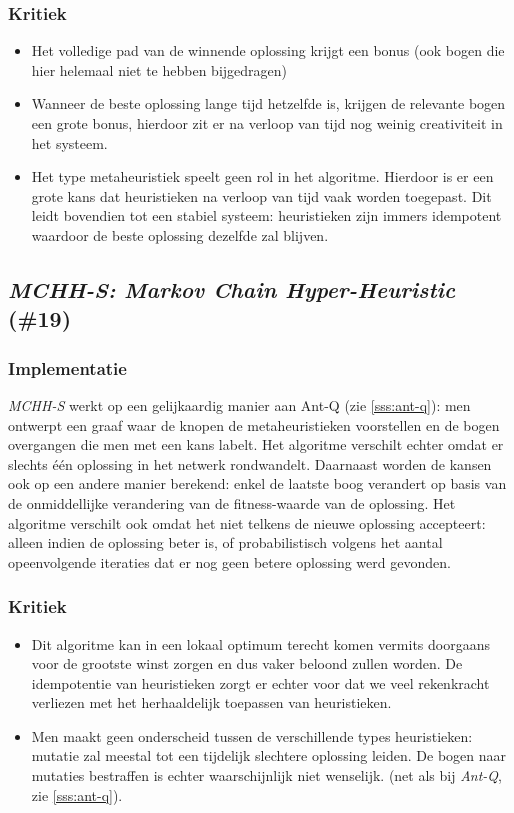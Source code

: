 \subsubsection{Kritiek}
\begin{itemize}
 \item Het volledige pad van de winnende oplossing krijgt een bonus (ook bogen die hier helemaal niet te hebben bijgedragen)
 \item Wanneer de beste oplossing lange tijd hetzelfde is, krijgen de relevante bogen een grote bonus, hierdoor zit er na verloop van tijd nog weinig creativiteit in het systeem.
 \item Het type metaheuristiek speelt geen rol in het algoritme. Hierdoor is er een grote kans dat \abls{} heuristieken na verloop van tijd vaak worden toegepast. Dit leidt bovendien tot een stabiel systeem: \abls{} heuristieken zijn immers idempotent waardoor de beste oplossing dezelfde zal blijven.
\end{itemize}
\subsection{\emph{MCHH-S: Markov Chain Hyper-Heuristic} (\#19)}
\label{sss:mchh-s}
\subsubsection{Implementatie}
\emph{MCHH-S}\cite{chesc-mchh-s,conf/gecco/McClymontK11} werkt op een gelijkaardig manier aan Ant-Q (zie \ref{sss:ant-q}): men ontwerpt een graaf waar de knopen de metaheuristieken voorstellen en de bogen overgangen die men met een kans labelt. Het algoritme verschilt echter omdat er slechts \'e\'en oplossing in het netwerk rondwandelt. Daarnaast worden de kansen ook op een andere manier berekend: enkel de laatste boog verandert op basis van de onmiddellijke verandering van de fitness-waarde van de oplossing. Het algoritme verschilt ook omdat het niet telkens de nieuwe oplossing accepteert: alleen indien de oplossing beter is, of probabilistisch volgens het aantal opeenvolgende iteraties dat er nog geen betere oplossing werd gevonden.
\subsubsection{Kritiek}
\begin{itemize}
 \item Dit algoritme kan in een lokaal optimum terecht komen vermits \abls{} doorgaans voor de grootste winst zorgen en dus vaker beloond zullen worden. De idempotentie van \abls{} heuristieken zorgt er echter voor dat we veel rekenkracht verliezen met het herhaaldelijk toepassen van \abls{} heuristieken.
 \item Men maakt geen onderscheid tussen de verschillende types heuristieken: mutatie zal meestal tot een tijdelijk slechtere oplossing leiden. De bogen naar mutaties bestraffen is echter waarschijnlijk niet wenselijk. (net als bij \emph{Ant-Q}, zie \ref{sss:ant-q}).
\end{itemize}
